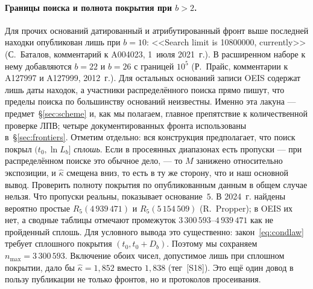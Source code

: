 \documentclass[11pt,a4paper]{article}
\theoremstyle{plain}
\theoremstyle{remark}
\begin{document}
\paragraph{Границы поиска и полнота покрытия при $b>2$.} Для прочих оснований
датированный и атрибутированный фронт выше последней находки опубликован лишь при
$b=10$: <<Search limit is 10800000, currently>> (С.~Баталов, комментарий к A004023,
1~июля 2021~г.). В расширенном наборе к нему добавляются $b=22$ и $b=26$ с
границей $10^5$ (Р.~Прайс, комментарии к A127997 и A127999, 2012~г.). Для
остальных оснований записи OEIS содержат лишь даты находок, а участники
распределённого поиска прямо пишут, что пределы поиска по большинству оснований
неизвестны. Именно эта лакуна --- предмет~\S\ref{sec:scheme} и, как мы полагаем,
главное препятствие к количественной проверке ЛПВ; четыре документированных фронта
использованы в~\S\ref{sec:frontiers}. Отметим
отдельно: вся конструкция предполагает, что поиск покрыл $(t_0,\ln L_b]$
\emph{сплошь}. Если в просеянных диапазонах есть пропуски --- при распределённом
поиске это обычное дело, --- то $M$ занижено относительно экспозиции, и $\hat\kappa$
смещена вниз, то есть в ту же сторону, что и наш основной вывод. Проверить полноту
покрытия по опубликованным данным в общем случае нельзя. Что пропуски реальны,
показывает основание~$5$. В 2024~г. найдены вероятно простые $R_5(4\,939\,471)$ и
$R_5(5\,154\,509)$ (R.~Propper); в OEIS их нет, а сводные таблицы отмечают
промежуток $3\,300\,593$--$4\,939\,471$ как не пройденный сплошь. Для условного
вывода это существенно: закон~\eqref{eq:condlaw} требует сплошного покрытия
$(t_0,t_0+D_b)$. Поэтому мы сохраняем $n_{\max}=3\,300\,593$. Включение обоих
чисел, допустимое лишь при сплошном покрытии, дало бы $\hat\kappa=1{,}852$ вместо
$1{,}838$ (тег~[S18]). Это ещё один довод в пользу публикации не только фронтов, но
и протоколов просеивания.
\end{document}
